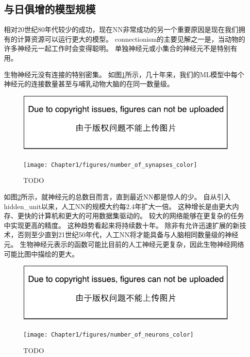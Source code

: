 
\subsection{与日俱增的模型规模}
\label{sec:increasing_model_sizes}

相对20世纪80年代较少的成功，现在\gls{NN}非常成功的另一个重要原因是现在我们拥有的计算资源可以运行更大的模型。
\gls{connectionism}的主要见解之一是，当动物的许多神经元一起工作时会变得聪明。
单独神经元或小集合的神经元不是特别有用。

生物神经元没有连接的特别密集。
如图\ref{fig:chap1_number_of_synapses_color}所示，几十年来，我们的\gls{ML}模型中每个神经元的连接数量甚至与哺乳动物大脑的在同一数量级。
\begin{figure}[!htb]
\ifOpenSource
\centerline{\includegraphics{figure.pdf}}
\else
\centerline{\texttt{[image: Chapter1/figures/number\_of\_synapses\_color]}}
\fi
\caption{TODO}
\label{fig:chap1_number_of_synapses_color}
\end{figure}

如图\ref{fig:chap1_number_of_neurons_color}所示，就神经元的总数目而言，直到最近\gls{NN}都是惊人的少。
自从引入\gls{hidden_unit}以来，人工\gls{NN}的规模大约每2.4年扩大一倍。
这种增长是由更大内存、更快的计算机和更大的可用数据集驱动的。
较大的网络能够在更复杂的任务中实现更高的精度。
这种趋势看起来将持续数十年。
除非有允许迅速扩展的新技术，否则至少直到21世纪50年代，人工\gls{NN}将才能具备与人脑相同数量级的神经元。
生物神经元表示的函数可能比目前的人工神经元更复杂，因此生物神经网络可能比图中描绘的更大。
\begin{figure}[!htb]
\ifOpenSource
\centerline{\includegraphics{figure.pdf}}
\else
\centerline{\texttt{[image: Chapter1/figures/number\_of\_neurons\_color]}}
\fi
\caption{TODO}
\label{fig:chap1_number_of_neurons_color}
\end{figure}


